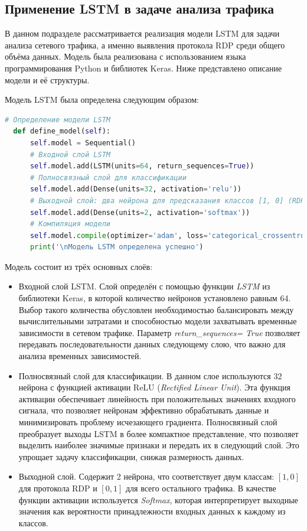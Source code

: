 \documentclass[bachelor, och, coursework]{SCWorks}
\begin{document}
  \subsection{Применение LSTM в задаче анализа трафика}

В данном подразделе рассматривается реализация модели LSTM для задачи анализа сетевого трафика, а именно выявления протокола RDP среди общего объёма 
данных. Модель была реализована с использованием языка программирования Python и библиотек Keras. Ниже представлено описание модели и её структуры.

Модель LSTM была определена следующим образом:

\begin{lstlisting}[language=Python, caption=Определение модели LSTM]
  # Определение модели LSTM
  def define_model(self):
      self.model = Sequential()
      # Входной слой LSTM
      self.model.add(LSTM(units=64, return_sequences=True))
      # Полносвязный слой для классификации
      self.model.add(Dense(units=32, activation='relu'))
      # Выходной слой: два нейрона для предсказания классов [1, 0] (RDP) и [0, 1] (не RDP)
      self.model.add(Dense(units=2, activation='softmax'))
      # Компиляция модели
      self.model.compile(optimizer='adam', loss='categorical_crossentropy', metrics=['accuracy'])
      print('\nМодель LSTM определена успешно')
\end{lstlisting}

Модель состоит из трёх основных слоёв:
\begin{itemize}
    \item Входной слой LSTM. Слой определён с помощью функции \textit{LSTM} из библиотеки Keras, в которой количество нейронов 
    установлено равным 64. Выбор такого количества обусловлен необходимостью балансировать между вычислительными затратами и способностью 
    модели захватывать временные зависимости в сетевом трафике. Параметр \textit{return\_sequences=} \textit{True} позволяет передавать последовательности 
    данных следующему слою, что важно для анализа временных зависимостей.
    
    \item Полносвязный слой для классификации. В данном слое используются 32 нейрона с функцией активации ReLU (\textit{Rectified Linear Unit}). 
    Эта функция активации обеспечивает линейность при положительных значениях входного сигнала, что позволяет нейронам эффективно обрабатывать данные и 
    минимизировать проблему исчезающего градиента. Полносвязный слой преобразует выходы LSTM в более компактное представление, что позволяет выделить 
    наиболее значимые признаки и передать их в следующий слой. Это упрощает задачу классификации, снижая размерность данных.
    
    \item Выходной слой. Содержит 2 нейрона, что соответствует двум классам: \([1, 0]\) для протокола RDP и \([0, 1]\) для всего остального 
    трафика. В качестве функции активации используется \textit{Softmax}, которая интерпретирует выходные значения как вероятности принадлежности входных 
    данных к каждому из классов.
\end{itemize}
\end{document}

